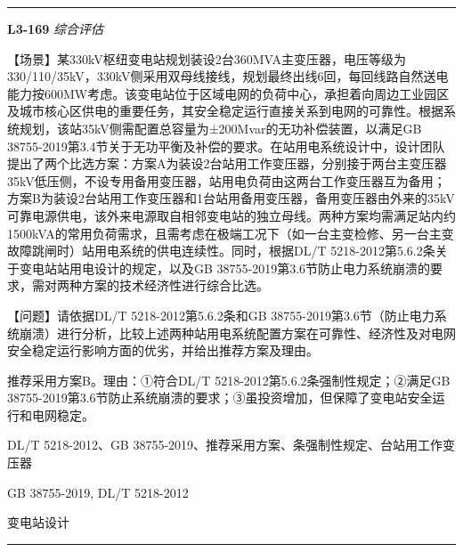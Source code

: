 \documentclass[12pt,a4paper]{ctexart}
\begin{document}
\vspace{4pt}
\hrule\vspace{6pt}

\noindent\textbf{L3-169} \hfill \textit{综合评估}
\begin{description}[leftmargin=1.5em,style=nextline,font=\normalfont]
  \item[Q:] 【场景】某330kV枢纽变电站规划装设2台360MVA主变压器，电压等级为330/110/35kV，330kV侧采用双母线接线，规划最终出线6回，每回线路自然送电能力按600MW考虑。该变电站位于区域电网的负荷中心，承担着向周边工业园区及城市核心区供电的重要任务，其安全稳定运行直接关系到电网的可靠性。根据系统规划，该站35kV侧需配置总容量为±200Mvar的无功补偿装置，以满足GB 38755-2019第3.4节关于无功平衡及补偿的要求。在站用电系统设计中，设计团队提出了两个比选方案：方案A为装设2台站用工作变压器，分别接于两台主变压器35kV低压侧，不设专用备用变压器，站用电负荷由这两台工作变压器互为备用；方案B为装设2台站用工作变压器和1台站用备用变压器，备用变压器由外来的35kV可靠电源供电，该外来电源取自相邻变电站的独立母线。两种方案均需满足站内约1500kVA的常用负荷需求，且需考虑在极端工况下（如一台主变检修、另一台主变故障跳闸时）站用电系统的供电连续性。同时，根据DL/T 5218-2012第5.6.2条关于变电站站用电设计的规定，以及GB 38755-2019第3.6节防止电力系统崩溃的要求，需对两种方案的技术经济性进行综合比选。

【问题】请依据DL/T 5218-2012第5.6.2条和GB 38755-2019第3.6节（防止电力系统崩溃）进行分析，比较上述两种站用电系统配置方案在可靠性、经济性及对电网安全稳定运行影响方面的优劣，并给出推荐方案及理由。
  \item[A:] 推荐采用方案B。理由：①符合DL/T 5218-2012第5.6.2条强制性规定；②满足GB 38755-2019第3.6节防止系统崩溃的要求；③虽投资增加，但保障了变电站安全运行和电网稳定。
  \item[KW:] DL/T 5218-2012、GB 38755-2019、推荐采用方案、条强制性规定、台站用工作变压器
  \item[Std:] GB 38755-2019, DL/T 5218-2012
  \item[Topic:] 变电站设计
\end{description}
\vspace{4pt}
\hrule\vspace{6pt}
\end{document}
